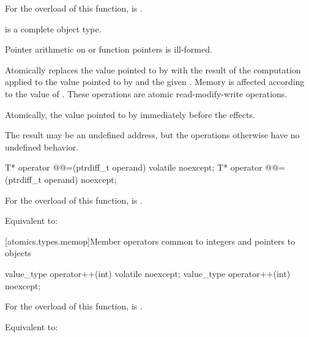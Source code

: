 \begin{itemdescr}
\pnum
\constraints
For the  overload of this function,
 is .

\pnum
\mandates
{} is a complete object type.
\begin{note}
Pointer arithmetic on  or function pointers is ill-formed.
\end{note}

\pnum
\effects
Atomically replaces the value pointed to by
 with the result of the computation applied to the
value pointed to by  and the given .
Memory is affected according to the value of .
These operations are atomic read-modify-write operations.

\pnum
\returns
Atomically, the value pointed to by  immediately before the effects.

\pnum
\remarks
The result may be an undefined address,
but the operations otherwise have no undefined behavior.
\end{itemdescr}

%
%
\begin{itemdecl}
T* operator @@=(ptrdiff_t operand) volatile noexcept;
T* operator @@=(ptrdiff_t operand) noexcept;
\end{itemdecl}

\begin{itemdescr}
\pnum
\constraints
For the  overload of this function,
 is .

\pnum
\effects
Equivalent to: 
\end{itemdescr}

[atomics.types.memop]{Member operators common to integers and pointers to objects}

%
%
\begin{itemdecl}
value_type operator++(int) volatile noexcept;
value_type operator++(int) noexcept;
\end{itemdecl}

\begin{itemdescr}
\pnum
\constraints
For the  overload of this function,
 is .

\pnum
\effects
Equivalent to: 
\end{itemdescr}

